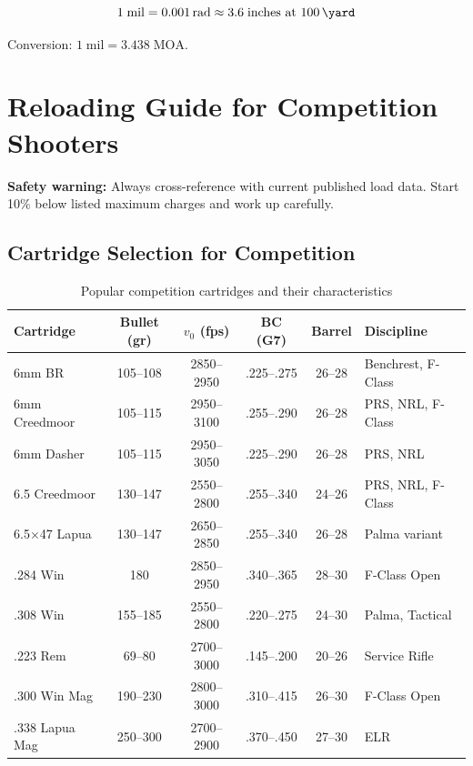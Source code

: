 \documentclass[11pt,twoside,openright]{report}
\begin{document}
\begin{equation}
  1\;\text{mil} = \SI{0.001}{\radian} \approx 3.6\;\text{inches at \SI{100}{\yard}}
  \label{eq:mil}
\end{equation}

Conversion: $1\;\text{mil} = 3.438\;\text{MOA}$.


\chapter{Reloading Guide for Competition Shooters}
\label{ch:reloading}

\textbf{Safety warning:} Always cross-reference with current published load data. Start 10\% below listed maximum charges and work up carefully.

\section{Cartridge Selection for Competition}

\begin{table}[H]
\centering
\caption{Popular competition cartridges and their characteristics}
\label{tab:cartridges}
\small
\begin{tabularx}{\textwidth}{@{}lccccX@{}}
\toprule
\textbf{Cartridge} & \textbf{Bullet (gr)} & \textbf{$v_0$ (fps)} & \textbf{BC (G7)} & \textbf{Barrel} & \textbf{Discipline} \\
\midrule
6mm BR & 105--108 & 2850--2950 & .225--.275 & 26--28 & Benchrest, F-Class \\
6mm Creedmoor & 105--115 & 2950--3100 & .255--.290 & 26--28 & PRS, NRL, F-Class \\
6mm Dasher & 105--115 & 2950--3050 & .225--.290 & 26--28 & PRS, NRL \\
6.5 Creedmoor & 130--147 & 2550--2800 & .255--.340 & 24--26 & PRS, NRL, F-Class \\
6.5$\times$47 Lapua & 130--147 & 2650--2850 & .255--.340 & 26--28 & Palma variant \\
.284 Win & 180 & 2850--2950 & .340--.365 & 28--30 & F-Class Open \\
.308 Win & 155--185 & 2550--2800 & .220--.275 & 24--30 & Palma, Tactical \\
.223 Rem & 69--80 & 2700--3000 & .145--.200 & 20--26 & Service Rifle \\
.300 Win Mag & 190--230 & 2800--3000 & .310--.415 & 26--30 & F-Class Open \\
.338 Lapua Mag & 250--300 & 2700--2900 & .370--.450 & 27--30 & ELR \\
\bottomrule
\end{tabularx}
\end{table}
\end{document}
